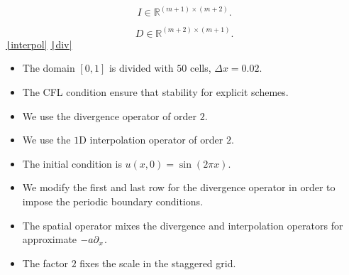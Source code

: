 \begin{frame}
	\frametitle{\secname}

	\begin{equation*}
		I\in\mathbb{R}^{\left(m+1\right)\times\left(m+2\right)}.
	\end{equation*}

	\begin{equation*}
		D\in\mathbb{R}^{\left(m+2\right)\times\left(m+1\right)}.
	\end{equation*}
	\href{https://carlosal1015.github.io/mole_examples/api_docs/matlab/src/matlab/interpol.html}{\texttt|interpol|}
	\href{https://carlosal1015.github.io/mole_examples/api_docs/matlab/src/matlab/div.html}{\texttt|div|}

	\begin{itemize}
		\item

		      The domain $\left[0,1\right]$ is divided with $50$
		      cells, $\Delta x=0.02$.

		\item

		      The CFL condition ensure that stability for explicit
		      schemes.

		\item

		      We use the divergence operator of order $2$.

		\item

		      We use the $1$D interpolation operator of order $2$.

		\item

		      The initial condition is
		      \begin{math}
			      u\left(x,0\right)=
			      \sin\left(2\pi x\right)
		      \end{math}.

		\item

		      We modify the first and last row for the divergence
		      operator in order to impose the periodic boundary conditions.

		\item

		      The spatial operator mixes the divergence and
		      interpolation operators for approximate $-a\difcp{}{x}$.

		\item

		      The factor $2$ fixes the scale in the staggered grid.
	\end{itemize}
\end{frame}

